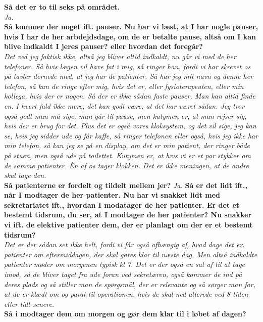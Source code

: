 \textbf{Så det er to til seks på området.}\\
\noindent
\textit{Ja.}\\
\noindent
\textbf{Så kommer der noget ift. pauser. Nu har vi læst, at I har nogle pauser, hvis I har de her arbdejdsdage, om de er betalte pause, altså om I kan blive indkaldt I jeres pauser? eller hvordan det foregår?}\\
\noindent
\textit{Det ved jeg faktisk ikke, altså jeg bliver altid indkaldt, nu går vi med de her telefoner.  Så hvis lægen vil have fat i mig, så ringer han, fordi vi har skrevet os på tavler dernede med, at jeg har de patienter. Så har jeg mit navn og denne her telefon, så kan de ringe efter mig, hvis det er, eller fysioterapeuten, eller min kollega, hvis der er nogen. Så der er ikke sådan faste pauser. Man kan altid finde en. I hvert fald ikke mere, det kan godt være, at det har været sådan. Jeg tror også godt man må sige, man går til pause, men kutymen er, at man rejser sig, hvis der er brug for det. Plus det er også vores kloksystem, og det vil sige, jeg kan se, hvis jeg sidder ude og får kaffe, så ringer telefonen eller også, hvis jeg ikke har min telefon, så kan jeg se på en display, om det er min patient, der ringer både på stuen, men også ude på toilettet. Kutymen er, at hvis vi er et par stykker om de samme patienter. Èn af os tager klokken. Det er ikke meningen, at de andre skal tage den.}\\
\noindent
\textbf{Så patienterne er fordelt og tildelt mellem jer?}
\noindent
\textit{Ja.}
\noindent
\textbf{Så er det lidt ift., når I modtager de her patienter. Nu har vi snakket lidt med sekretariatet ift., hvordan I modatager de her patienter. Er det et bestemt tidsrum, du ser, at I modtager de her patienter? Nu snakker vi ift. de elektive patienter dem, der er planlagt om der er et bestemt tidsrum?}\\
\noindent
\textit{Det er der sådan set ikke helt, fordi vi får også afhængig af, hvad dage det er, patienter om eftermiddagen, der skal gøres klar til næste dag. Men altså indkaldte patienter møder om morgenen typisk kl 7. Det er der også en sat af til at tage imod, så de bliver taget fra ude foran ved sekretæren, også kommer de ind på deres plads og så stiller man de spørgsmål, der er relevante og så sørger man for, at de er klædt om og parat til operationen, hvis de skal ned allerede ved 8-tiden eller lidt senere.}\\
\noindent
\textbf{Så i modtager dem om morgen og gør dem klar til i løbet af dagen?}\\
